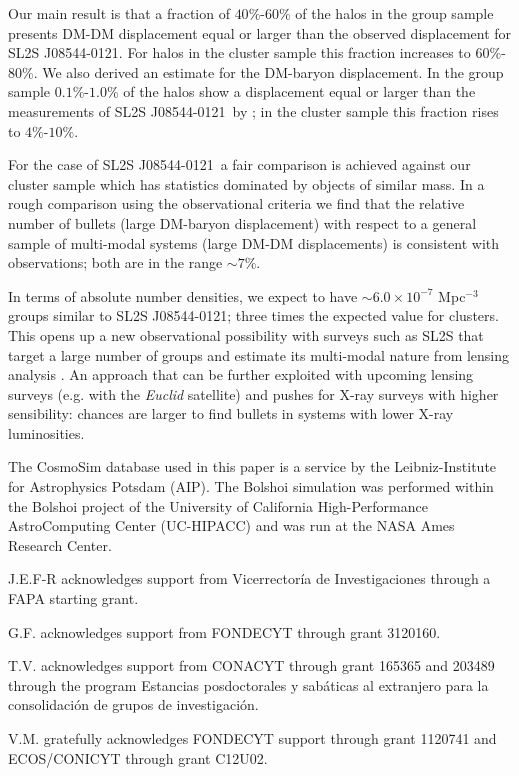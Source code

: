 \documentclass{emulateapj}
\newcommand{\bullg}{SL2S J08544-0121}
\begin{document}
Our main result is that a fraction of $40\%$-$60\%$ of the halos
in the group sample presents DM-DM displacement equal or larger than the
observed displacement for \bullg. For halos in the cluster sample this
fraction increases to $60\%$-$80\%$. We also derived an
estimate for the DM-baryon displacement. In the group sample
$0.1\%$-$1.0\%$ of the halos show a displacement equal or larger than
the  measurements of \bullg\ by \citep{Gastaldello}; in the cluster
sample this fraction rises to $4\%$-$10\%$. 

For the case of \bullg\ a fair comparison is achieved against our cluster
sample which has statistics dominated by objects of similar mass. In
a rough comparison using the observational criteria \citep{Foex2013,
  Gastaldello} we find that the relative number of bullets
(large DM-baryon displacement) with respect to a general sample of
multi-modal systems (large DM-DM displacements) is consistent with
observations; both are in the range $\sim 7\%$. 

In terms of absolute number densities, we expect to have $\sim 6.0\times
10^{-7}$ Mpc$^{-3}$ groups similar to \bullg; three times the expected
value for clusters. This opens up a new observational possibility with surveys
such as SL2S that target a large number of groups and estimate its
multi-modal nature from lensing analysis \citep{Foex2013}. An approach
that can be further exploited with upcoming lensing surveys (e.g. with
the {\it Euclid} satellite) and pushes for X-ray surveys with higher
sensibility: chances are larger to find bullets in systems with lower
X-ray luminosities.

The CosmoSim database used in this paper is a service by the
Leibniz-Institute for Astrophysics Potsdam (AIP). The  Bolshoi
simulation was performed within the Bolshoi project of the University
of California High-Performance AstroComputing Center (UC-HIPACC) and
was run at the NASA Ames Research Center. 

J.E.F-R acknowledges support from Vicerrector\'ia de
Investigaciones through a FAPA starting grant.

G.F. acknowledges support from FONDECYT through grant 3120160.

T.V. acknowledges support from CONACYT through grant 165365 and
203489 through the program Estancias posdoctorales y sab\'aticas al
extranjero para la consolidaci\'on de grupos de investigaci\'on.  

V.M. gratefully acknowledges FONDECYT support through grant 1120741
and ECOS/CONICYT through grant C12U02. 




 
\end{document}
